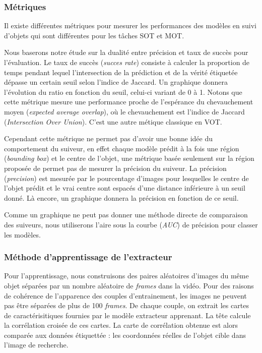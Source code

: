 \documentclass[10pt,twocolumn,letterpaper,french]{article}
\begin{document}
\subsubsection*{Métriques}
\label{metrics}


Il existe différentes métriques pour mesurer les performances des modèles en suivi d'objets qui sont différentes pour les tâches SOT et MOT.

Nous baserons notre étude sur la dualité entre précision et taux de succès pour l'évaluation. Le taux de succès (\textit{succes rate}) consiste à calculer la proportion de temps pendant lequel l'intersection de la prédiction et de la vérité étiquetée dépasse un certain seuil selon l'indice de Jaccard. Un graphique donnera l'évolution du ratio en fonction du seuil, celui-ci variant de 0 à 1. Notons que cette métrique mesure une performance proche de l'espérance du chevauchement moyen (\textit{expected average overlap}), où le chevauchement est l'indice de Jaccard (\textit{Intersection Over Union}). C'est une autre métique classique en VOT.

Cependant cette métrique ne permet pas d'avoir une bonne idée du comportement du suiveur, en effet chaque modèle prédit à la fois une région (\textit{bounding box}) et le centre de l'objet, une métrique basée seulement sur la région proposée de permet pas de mesurer la précision du suiveur. La précision (\textit{precision}) est mesurée par le pourcentage d'images pour lesquelles le centre de l'objet prédit et le vrai centre sont espacés d'une distance inférieure à un seuil donné. Là encore, un graphique donnera la précision en fonction de ce seuil.

Comme un graphique ne peut pas donner une méthode directe de comparaison des suiveurs, nous utiliserons l'aire sous la courbe (\textit{AUC}) de précision pour classer les modèles. 

\subsubsection*{Méthode d'apprentissage de l'extracteur}

Pour l'apprentissage, nous construisons des paires aléatoires d'images du même objet séparées par un nombre aléatoire de \textit{frames} dans la vidéo. Pour des raisons de cohérence de l'apparence des couples d'entrainement, les images ne peuvent pas être séparées de plus de 100 \textit{frames}. De chaque couple, on extrait les cartes de caractérisitiques fournies par le modèle extracteur apprenant. La tête calcule la corrélation croisée de ces cartes. La carte de corrélation obtenue est alors comparée aux données étiquettée : les coordonnées réelles de l'objet cible dans l'image de recherche.
\end{document}
